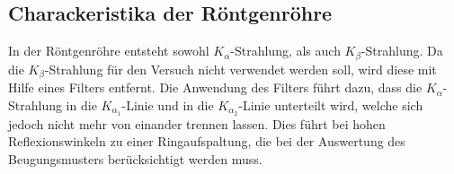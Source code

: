\subsection{Charackeristika der Röntgenröhre}

In der Röntgenröhre entsteht sowohl $K_\alpha$-Strahlung, als auch $K_\beta$-Strahlung. Da die $K_\beta$-Strahlung für den Versuch nicht verwendet werden soll, wird diese mit Hilfe eines Filters entfernt.
Die Anwendung des Filters führt dazu, dass die $K_\alpha$-Strahlung in die $K_{\alpha_1}$-Linie und in die $K_{\alpha_2}$-Linie unterteilt wird, welche sich jedoch nicht mehr von einander trennen
lassen. Dies führt bei hohen Reflexionswinkeln zu einer Ringaufspaltung, die bei der Auswertung des Beugungsmusters berücksichtigt werden muss.
